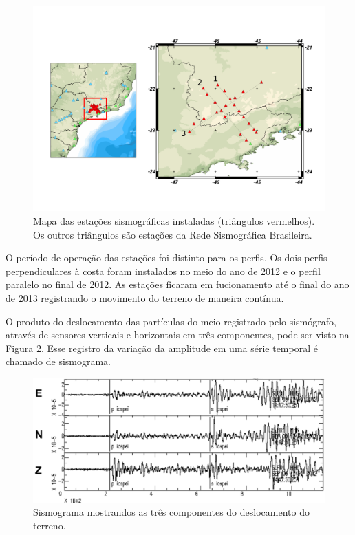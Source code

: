\begin{figure}[!ht]
\centering
\includegraphics[scale=0.4]{mapa_das_estacoes_simosgraficas_instaladas.png}
\caption{Mapa das estações sismográficas instaladas (triângulos vermelhos). Os outros triângulos são estações da Rede Sismográfica Brasileira.}
\label{map_loc}
\end{figure}

O período de operação das estações foi distinto para os perfis. Os dois perfis perpendiculares à costa foram instalados no meio do ano de 2012 e o perfil paralelo no final de 2012. As estações ficaram em fucionamento até o final do ano de 2013 registrando o movimento do terreno de maneira contínua. 

O produto do deslocamento das partículas do meio registrado pelo sismógrafo, através de sensores verticais e horizontais em três componentes, pode ser visto na Figura \ref{simograma}. Esse registro da variação da amplitude em uma série temporal é chamado de sismograma. 

\begin{figure}[!ht]
\centering
\includegraphics[scale=0.6]{sismograma.png}
\caption{Sismograma mostrandos as três componentes do deslocamento do terreno.}
\label{simograma}
\end{figure}

